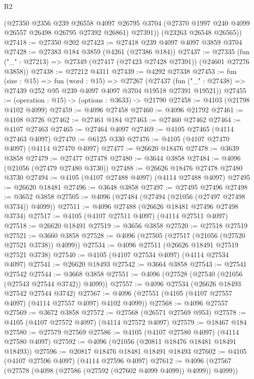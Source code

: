\begin{lexlean}{R2}
\begin{coremodule}
        (@27350
          @2356
          @239
          @26558
          @4097
          @26795
          @3704
          (@27370 @1997 @240 @4099 @26557 @26498 @26795 @27392 @26861)
          @27391))
      (@23263 @26548 @26565))
@27418 := @27350 @202
@27423 := @27418 @239 @4097 @4097 @3859 @3704
@27428 := @27383 @184 @3859 (@4261 (@27386 @184))
@27437 := @27335
    (fun ("_" : @27213) => @27349 (@27417 (@27423 @27428 @27391)) (@24601 @27276 @3858))
@27438 := @27212 @4311
@27439 := @4292 @27338
@27453 := fun (size : @15) =>
  fun (word : @15) =>
  @27267
    (@27437 (fun ("_" : @27438) => @27439 @252 @95 @239 @4097 @4097 @3704 @19518 @27391 @19521))
@27455 := (operation : @15) -> (options : @3633) -> @21790
@27458 := @4103 (@21798 @4102 @4099)
@27459 := @4096 @27458
@27460 := @4096 @21792
@27461 := @4108 @3726
@27462 := @27461 @184
@27463 := @27460 @27462
@27464 := @4107 @27463
@27465 := @27464 @4097
@27469 := @4105 @27465 (@4114 @27463 @4097)
@27470 := @6125 @330
@27476 := @4105 (@4107 @27470 @4097) (@4114 @27470 @4097)
@27477 := @26620 @18476
@27478 := @3639 @3858
@27479 := @27477 @27478
@27480 := @3644 @3858
@27484 := @4096 (@21056 (@27479 @27480 @3730))
@27488 := @26626 @18476 @27478 @27480 @3730
@27494 := @4105 (@4107 @27488 @4097) (@4114 @27488 @4097)
@27495 := @26620 @18481
@27496 := @3648 @3858
@27497 := @27495 @27496
@27498 := @3652 @3858
@27505 := @4096 (@27484 (@27494 (@21056 (@27497 @27498 @3734)) @4099))
@27511 := @4096 @27488 (@26626 @18481 @27496 @27498 @3734)
@27517 := @4105 (@4107 @27511 @4097) (@4114 @27511 @4097)
@27518 := @26620 @18491
@27519 := @3656 @3858
@27520 := @27518 @27519
@27521 := @3660 @3858
@27528 := @4096 (@27505 (@27517 (@21056 (@27520 @27521 @3738)) @4099))
@27534 := @4096 @27511 (@26626 @18491 @27519 @27521 @3738)
@27540 := @4105 (@4107 @27534 @4097) (@4114 @27534 @4097)
@27541 := @26620 @18493
@27542 := @3664 @3858
@27543 := @27541 @27542
@27544 := @3668 @3858
@27551 := @4096 (@27528 (@27540 (@21056 (@27543 @27544 @3742)) @4099))
@27557 := @4096 @27534 (@26626 @18493 @27542 @27544 @3742)
@27567 := @4096 (@27551 (@4105 (@4107 @27557 @4097) (@4114 @27557 @4097) @4102 @4099))
@27568 := @4096 @27557
@27569 := @3672 @3858
@27572 := @27568 (@26571 @27569 @953)
@27578 := @4105 (@4107 @27572 @4097) (@4114 @27572 @4097)
@27579 := @18467 @184
@27580 := @27579 @27569
@27586 := @4105 (@4107 @27580 @4097) (@4114 @27580 @4097)
@27592 := @4096 (@21056 (@20811 @18476 @18481 @18491 @18493))
@27596 := @20817 @18476 @18481 @18491 @18493
@27602 := @4105 (@4107 @27596 @4097) (@4114 @27596 @4097)
@27612 := @4096 (@27567 (@27578 (@4098 (@27586 (@27592 (@27602 @4099 @4099)) @4099)) @4099))

\end{coremodule}
\end{lexlean}
